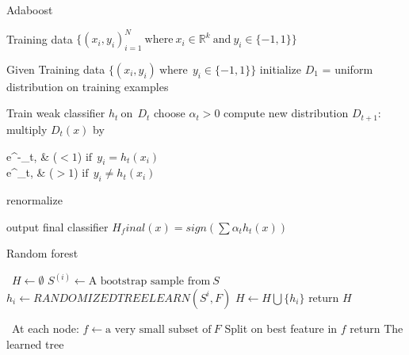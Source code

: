 \documentclass[a4paper]{article}
\begin{document}
  \begin{algorithm}
   \caption{Adaboost ~\cite{adaboostsecond}}
    \begin{algorithmic}[1]
    \INPUT 
    \Statex Training data $\{(x_i,y_i)_{i=1}^N \ \text{where}\ x_i \in  \mathbb{R}^k \ \text{and} \  y_i \in \{-1,1\} \}$
   
    \State Given Training data $\{(x_i,y_i) \ \text{where}\  \  y_i \in \{-1,1\} \}$
    \State initialize $D_1$ = uniform distribution on training examples
   
            \State Train weak classifier $h_t \  \text{on}\   \   D_t $
            \State choose $\alpha_t > 0 $
            \State compute new distribution $D_{t+1}$:
              \State multiply $D_t(x)$ by \begin{numcases}{}
  e^{-\alpha_t}, &  ($<1$) $ \text{if}\  \  y_i = h_t(x_i) $\\
   e^{\alpha_t}, & ($>1$) $ \text{if}\  \  y_i \neq h_t(x_i) $
\end{numcases}
\State renormalize
         \EndFor 
         
  \State output final classifier $H_final(x) = sign (\sum\alpha_t h_t(x))$
            
        
        
         
        
        \EndFor
        
        


\end{algorithmic}
\end{algorithm}



  \begin{algorithm}
   \caption{Random forest ~\cite{randomforest1}}
    \begin{algorithmic}[1]
      \
      \State $H \leftarrow  \emptyset $
            \State $S^{(i)}\leftarrow \text{A bootstrap sample from} \  S $
            \State $h_i \leftarrow RANDOMIZEDTREELEARN(S^{i},F)$
            \State $H \leftarrow H \bigcup \{h_i\}$
        \EndFor
        \State return $H$
         



 \EndFunction

  \ 
  \State At each node:
  \State $f \leftarrow \text{a very small subset of} \ F $
  \State Split on best feature in $f$
  \State return The learned tree
   \EndFunction

\end{algorithmic}
\end{algorithm}
\end{document}
